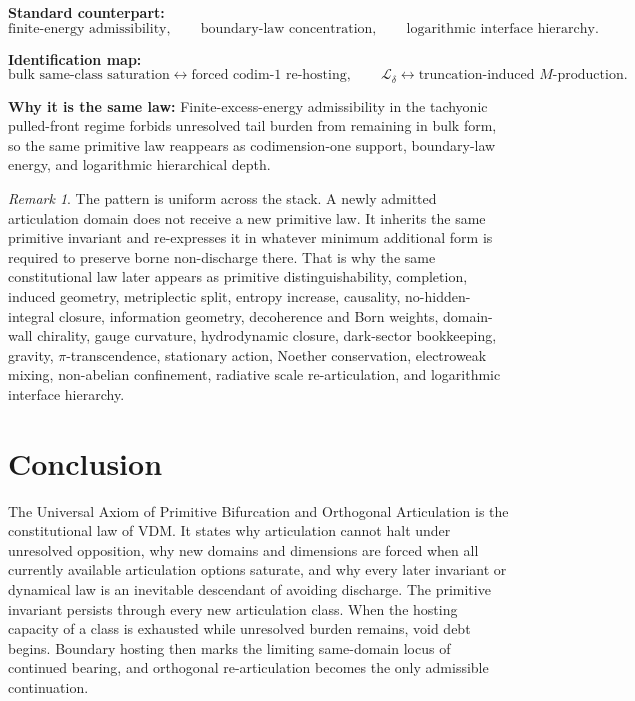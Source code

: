 \documentclass[11pt]{article}
\theoremstyle{definition}
\theoremstyle{plain}
\theoremstyle{remark}
\newtheorem{remark}{Remark}
\begin{document}
\textbf{Standard counterpart:}
\[
\text{finite-energy admissibility},
\qquad
\text{boundary-law concentration},
\qquad
\text{logarithmic interface hierarchy}.
\]

\textbf{Identification map:}
\[
\text{bulk same-class saturation}
\leftrightarrow
\text{forced codim-1 re-hosting},
\qquad
\mathcal L_\delta \leftrightarrow \text{truncation-induced }M\text{-production}.
\]

\textbf{Why it is the same law:} Finite-excess-energy admissibility in the
tachyonic pulled-front regime forbids unresolved tail burden from remaining in
bulk form, so the same primitive law reappears as codimension-one support,
boundary-law energy, and logarithmic hierarchical depth.

\begin{remark}
The pattern is uniform across the stack. A newly admitted articulation domain
does not receive a new primitive law. It inherits the same primitive invariant
and re-expresses it in whatever minimum additional form is required to preserve
borne non-discharge there. That is why the same constitutional law later
appears as primitive distinguishability, completion, induced geometry,
metriplectic split, entropy increase, causality, no-hidden-integral closure,
information geometry, decoherence and Born weights, domain-wall chirality,
gauge curvature, hydrodynamic closure, dark-sector bookkeeping, gravity,
\(\pi\)-transcendence, stationary action, Noether conservation, electroweak
mixing, non-abelian confinement, radiative scale re-articulation, and
logarithmic interface hierarchy.
\end{remark}

\section{Conclusion}

The Universal Axiom of Primitive Bifurcation and Orthogonal Articulation is
the constitutional law of VDM. It states why articulation cannot halt under
unresolved opposition, why new domains and dimensions are forced when all
currently available articulation options saturate, and why every later
invariant or dynamical law is an inevitable descendant of avoiding discharge.
The primitive invariant persists through every new articulation class. When
the hosting capacity of a class is exhausted while unresolved burden remains,
void debt begins. Boundary hosting then marks the limiting same-domain locus
of continued bearing, and orthogonal re-articulation becomes the only
admissible continuation.
\end{document}
